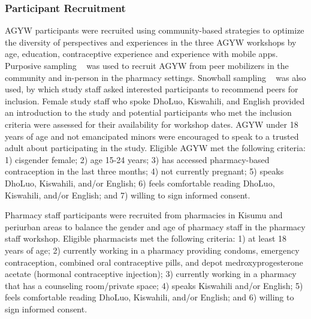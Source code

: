 \subsubsection{Participant Recruitment}
AGYW participants were recruited using community-based strategies to optimize the diversity of perspectives and experiences in the three AGYW workshops by age, education, contraceptive experience and experience with mobile apps. Purposive sampling ~\cite{tongco2007purposive} was used to recruit AGYW from peer mobilizers in the community and in-person in the pharmacy settings. Snowball sampling ~\cite{parker2019snowball} was also used, by which study staff asked interested participants to recommend peers for inclusion. Female study staff who spoke DhoLuo, Kiswahili, and English provided an introduction to the study and potential participants who met the inclusion criteria were assessed for their availability for workshop dates. AGYW under 18 years of age and not emancipated minors were encouraged to speak to a trusted adult about participating in the study. Eligible AGYW met the following criteria: 1) cisgender female; 2) age 15-24 years; 3) has accessed pharmacy-based contraception in the last three months; 4) not currently pregnant; 5) speaks DhoLuo, Kiswahili, and/or English; 6) feels comfortable reading DhoLuo, Kiswahili, and/or English; and 7) willing to sign informed consent. 

Pharmacy staff participants were recruited from pharmacies in Kisumu and periurban areas to balance the gender and age of pharmacy staff in the pharmacy staff workshop. Eligible pharmacists met the following criteria: 1) at least 18 years of age; 2) currently working in a pharmacy providing condoms, emergency contraception, combined oral contraceptive pills, and depot medroxyprogesterone acetate (hormonal contraceptive injection); 3) currently working in a pharmacy that has a counseling room/private space; 4) speaks Kiswahili and/or English; 5) feels comfortable reading DhoLuo, Kiswahili, and/or English; and 6) willing to sign informed consent. 


